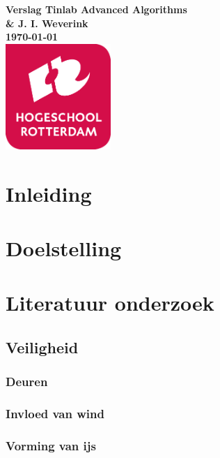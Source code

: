 \documentclass{article}
\begin{document}
\sffamily
\begin{titlepage}
  \centering
    \vfill
    {\bfseries\Huge
      Verslag Tinlab Advanced Algorithms \\
        \vskip2cm
      }
      {\bfseries\Large
        \& J. I. Weverink\\
      }
      {
        \bfseries\normalsize
        \vskip1cm
        \today\\
    }
    \vfill
    \includegraphics[width=4cm]{logohr.png} %
    \vfill
    \vfill
\end{titlepage}
\newpage
\tableofcontents

\clearpage %
\section{Inleiding}

\clearpage %
\section{Doelstelling} 

\clearpage %
\section{Literatuur onderzoek} %

\subsection{Veiligheid}

\subsubsection{Deuren}

\subsubsection{Invloed van wind}

\subsubsection{Vorming van ijs}




\begin{thebibliography}{9}
\end{thebibliography}
\end{document}
